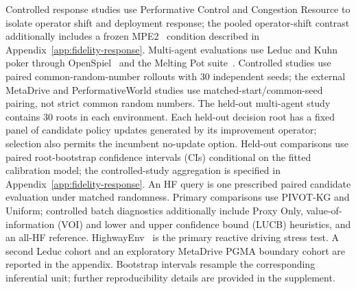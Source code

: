 \documentclass{article}
\begin{document}
Controlled response studies use Performative Control and Congestion Resource
to isolate operator shift and deployment response; the pooled operator-shift
contrast additionally includes a frozen MPE2~\citep{lowe2017maddpg} condition
described in Appendix~\ref{app:fidelity-response}. Multi-agent evaluations use Leduc and
Kuhn poker through OpenSpiel~\citep{lanctot2019openspiel} and the Melting Pot
suite~\citep{leibo2021meltingpot}. Controlled studies use paired
common-random-number rollouts with 30 independent seeds; the external
MetaDrive and PerformativeWorld studies use matched-start/common-seed pairing,
not strict common random numbers. The held-out
multi-agent study contains 30 roots in each environment. Each held-out decision
root has a fixed panel of candidate policy updates generated by its improvement
operator; selection also permits the incumbent no-update option. Held-out comparisons
use paired root-bootstrap confidence intervals (CIs) conditional on the fitted calibration
model; the controlled-study aggregation is specified in
Appendix~\ref{app:fidelity-response}. An HF query is one prescribed paired
candidate evaluation under matched randomness. Primary comparisons use
PIVOT-KG and Uniform; controlled batch diagnostics additionally include
Proxy Only, value-of-information (VOI) and lower and upper confidence bound (LUCB) heuristics, and an all-HF reference. HighwayEnv~\citep{highwayenv2018} is the
primary reactive driving stress test. A second Leduc cohort and an exploratory
MetaDrive PGMA boundary cohort are reported in the appendix. Bootstrap intervals
resample the corresponding inferential unit; further reproducibility details
are provided in the supplement.
\end{document}
